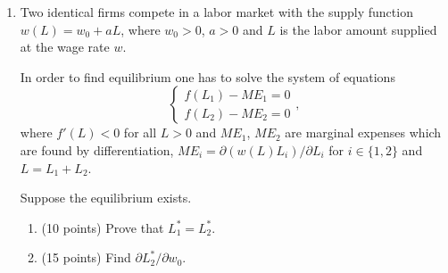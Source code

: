 \documentclass[12pt]{article} %
\theoremstyle{definition} %
\begin{document}
\begin{enumerate}[resume]
  \item Two identical firms compete in a labor market with the supply function $w(L)= w_0 + aL$, 
  where $w_0>0$, $a>0$ and $L$ is the labor amount supplied at the wage rate $w$.
  
  In order to find equilibrium one has to solve the system of equations
  \[
  \begin{cases}
    f(L_1) - ME_1 = 0 \\
    f(L_2) - ME_2 = 0
  \end{cases},
  \]
  where $f'(L)<0$ for all $L>0$ 
  and $ME_1$, $ME_2$ are marginal expenses which are found by differentiation, 
  $ME_i = \partial (w(L)L_i)/\partial L_i$ for $i \in \{1, 2\}$ and $L = L_1 + L_2$. 
  
  Suppose the equilibrium exists.
  \begin{enumerate}
    \item (10 points) Prove that $L_1^*=L_2^*$.
    \item (15 points) Find $\partial L_2^*/\partial w_0$.
  \end{enumerate}
  
  \end{enumerate}
  
\end{document}
